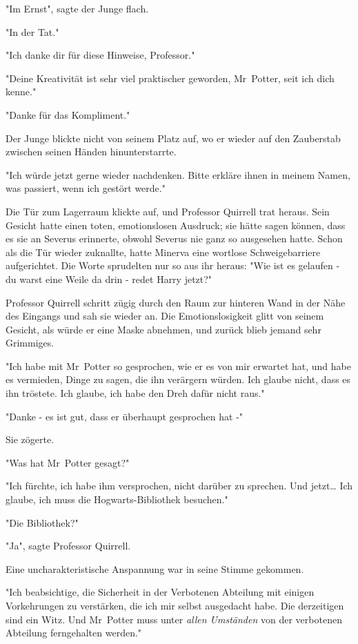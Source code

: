 {"Im Ernst", sagte der Junge flach.

"In der Tat."

"Ich danke dir für diese Hinweise, Professor."

"Deine Kreativität ist sehr viel praktischer geworden, Mr~Potter, seit ich dich kenne."

"Danke für das Kompliment."

Der Junge blickte nicht von seinem Platz auf, wo er wieder auf den Zauberstab zwischen seinen Händen hinunterstarrte.

"Ich würde jetzt gerne wieder nachdenken. Bitte erkläre ihnen in meinem Namen, was passiert, wenn ich gestört werde."

Die Tür zum Lagerraum klickte auf, und Professor Quirrell trat heraus. Sein Gesicht hatte einen toten, emotionslosen Ausdruck; sie hätte sagen können, dass es sie an Severus erinnerte, obwohl Severus nie ganz so ausgesehen hatte. Schon als die Tür wieder zuknallte, hatte Minerva eine wortlose Schweigebarriere aufgerichtet. Die Worte sprudelten nur so aus ihr heraus: "Wie ist es gelaufen - du warst eine Weile da drin - redet Harry jetzt?"

Professor Quirrell schritt zügig durch den Raum zur hinteren Wand in der Nähe des Eingangs und sah sie wieder an. Die Emotionslosigkeit glitt von seinem Gesicht, als würde er eine Maske abnehmen, und zurück blieb jemand sehr Grimmiges.

"Ich habe mit Mr~Potter so gesprochen, wie er es von mir erwartet hat, und habe es vermieden, Dinge zu sagen, die ihn verärgern würden. Ich glaube nicht, dass es ihn tröstete. Ich glaube, ich habe den Dreh dafür nicht raus."

"Danke - es ist gut, dass er überhaupt gesprochen hat -"

Sie zögerte.

"Was hat Mr~Potter gesagt?"

"Ich fürchte, ich habe ihm versprochen, nicht darüber zu sprechen. Und jetzt… Ich glaube, ich muss die Hogwarts-Bibliothek besuchen."

"Die Bibliothek?"

"Ja", sagte Professor Quirrell.

Eine uncharakteristische Anspannung war in seine Stimme gekommen.

"Ich beabsichtige, die Sicherheit in der Verbotenen Abteilung mit einigen Vorkehrungen zu verstärken, die ich mir selbst ausgedacht habe. Die derzeitigen sind ein Witz. Und Mr~Potter muss unter \emph{allen Umständen} von der verbotenen Abteilung ferngehalten werden."

}
